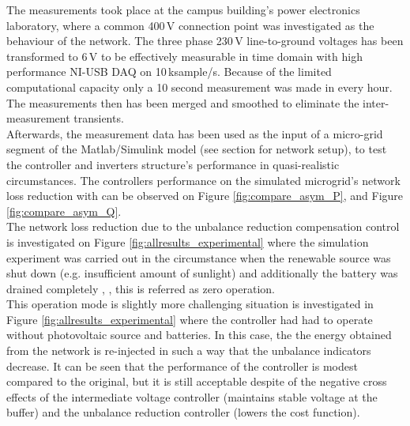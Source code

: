             The measurements took place at the campus building's power electronics laboratory, where a common 400\,V connection point was investigated as the behaviour of the network. The three phase 230\,V line-to-ground voltages has been transformed to 6\,V to be effectively measurable in time domain with high performance NI-USB DAQ on 10\,ksample/s. Because of the limited computational capacity only a 10 second measurement was made in every hour.  The measurements then has been merged and smoothed to eliminate the inter-measurement transients.\\
            Afterwards, the measurement data has been used as the input of a micro-grid segment of the Matlab/Simulink model (see section  for network setup), to test the controller and inverters structure's performance in quasi-realistic circumstances. The controllers performance on the simulated microgrid's network loss reduction with can be observed on Figure \ref{fig:compare_asym_P}, and Figure \ref{fig:compare_asym_Q}.\\
            The network loss reduction due to the unbalance reduction compensation control is investigated on Figure \ref{fig:allresults_experimental} where the simulation experiment was carried out in the circumstance when the renewable source was shut down (e.g. insufficient amount of sunlight) and additionally the battery was drained completely  \cite{Neukirchner2015}, \cite{neukirchner2015examination}, this is referred as zero operation.\\
            This operation mode is slightly more challenging situation is investigated in Figure \ref{fig:allresults_experimental} where the controller had had to operate without photovoltaic source and batteries. In this case, the the energy obtained from the network is re-injected in such a way that the unbalance indicators decrease. It can be seen that the performance of the controller is modest compared to the original, but it is still acceptable despite of the negative cross effects of the intermediate voltage controller (maintains stable voltage at the buffer) and the unbalance reduction controller (lowers the cost function).
            \newpage

